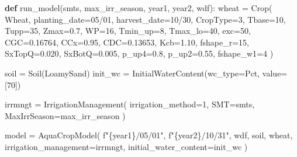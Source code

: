 \documentclass[
  letterpaper,
  DIV=11,
  numbers=noendperiod]{scrartcl}
\newenvironment{Shaded}{\begin{snugshade}}{\end{snugshade}}
\newcommand{\DecValTok}[1]{\textcolor[rgb]{0.68,0.00,0.00}{#1}}
\newcommand{\FloatTok}[1]{\textcolor[rgb]{0.68,0.00,0.00}{#1}}
\newcommand{\KeywordTok}[1]{\textcolor[rgb]{0.00,0.23,0.31}{\textbf{#1}}}
\newcommand{\NormalTok}[1]{\textcolor[rgb]{0.00,0.23,0.31}{#1}}
\newcommand{\OperatorTok}[1]{\textcolor[rgb]{0.37,0.37,0.37}{#1}}
\newcommand{\SpecialCharTok}[1]{\textcolor[rgb]{0.37,0.37,0.37}{#1}}
\newcommand{\SpecialStringTok}[1]{\textcolor[rgb]{0.13,0.47,0.30}{#1}}
\newcommand{\StringTok}[1]{\textcolor[rgb]{0.13,0.47,0.30}{#1}}
\begin{document}
\begin{Shaded}
\begin{Highlighting}[]
\KeywordTok{def}\NormalTok{ run\_model(smts, max\_irr\_season, year1, year2, wdf):}
\NormalTok{    wheat }\OperatorTok{=}\NormalTok{ Crop(}
        \StringTok{\textquotesingle{}Wheat\textquotesingle{}}\NormalTok{,}
\NormalTok{        planting\_date}\OperatorTok{=}\StringTok{\textquotesingle{}05/01\textquotesingle{}}\NormalTok{,}
\NormalTok{        harvest\_date}\OperatorTok{=}\StringTok{\textquotesingle{}10/30\textquotesingle{}}\NormalTok{,}
\NormalTok{        CropType}\OperatorTok{=}\DecValTok{3}\NormalTok{,}
\NormalTok{        Tbase}\OperatorTok{=}\DecValTok{10}\NormalTok{,}
\NormalTok{        Tupp}\OperatorTok{=}\DecValTok{35}\NormalTok{,}
\NormalTok{        Zmax}\OperatorTok{=}\FloatTok{0.7}\NormalTok{,}
\NormalTok{        WP}\OperatorTok{=}\DecValTok{16}\NormalTok{,}
\NormalTok{        Tmin\_up}\OperatorTok{=}\DecValTok{8}\NormalTok{,}
\NormalTok{        Tmax\_lo}\OperatorTok{=}\DecValTok{40}\NormalTok{,}
\NormalTok{        exc}\OperatorTok{=}\DecValTok{50}\NormalTok{,}
\NormalTok{        CGC}\OperatorTok{=}\FloatTok{0.16764}\NormalTok{,}
\NormalTok{        CCx}\OperatorTok{=}\FloatTok{0.95}\NormalTok{,}
\NormalTok{        CDC}\OperatorTok{=}\FloatTok{0.13653}\NormalTok{,}
\NormalTok{        Kcb}\OperatorTok{=}\FloatTok{1.10}\NormalTok{,}
\NormalTok{        fshape\_r}\OperatorTok{=}\DecValTok{15}\NormalTok{,}
\NormalTok{        SxTopQ}\OperatorTok{=}\FloatTok{0.020}\NormalTok{,}
\NormalTok{        SxBotQ}\OperatorTok{=}\FloatTok{0.005}\NormalTok{,}
\NormalTok{        p\_up4}\OperatorTok{=}\FloatTok{0.8}\NormalTok{,}
\NormalTok{        p\_up2}\OperatorTok{=}\FloatTok{0.55}\NormalTok{,}
\NormalTok{        fshape\_w1}\OperatorTok{=}\DecValTok{4}
\NormalTok{    )}

\NormalTok{    soil }\OperatorTok{=}\NormalTok{ Soil(}\StringTok{\textquotesingle{}LoamySand\textquotesingle{}}\NormalTok{)}
\NormalTok{    init\_wc }\OperatorTok{=}\NormalTok{ InitialWaterContent(wc\_type}\OperatorTok{=}\StringTok{\textquotesingle{}Pct\textquotesingle{}}\NormalTok{, value}\OperatorTok{=}\NormalTok{[}\DecValTok{70}\NormalTok{])}

\NormalTok{    irrmngt }\OperatorTok{=}\NormalTok{ IrrigationManagement(}
\NormalTok{        irrigation\_method}\OperatorTok{=}\DecValTok{1}\NormalTok{,}
\NormalTok{        SMT}\OperatorTok{=}\NormalTok{smts,}
\NormalTok{        MaxIrrSeason}\OperatorTok{=}\NormalTok{max\_irr\_season}
\NormalTok{    )}

\NormalTok{    model }\OperatorTok{=}\NormalTok{ AquaCropModel(}
        \SpecialStringTok{f"}\SpecialCharTok{\{}\NormalTok{year1}\SpecialCharTok{\}}\SpecialStringTok{/05/01"}\NormalTok{,}
        \SpecialStringTok{f"}\SpecialCharTok{\{}\NormalTok{year2}\SpecialCharTok{\}}\SpecialStringTok{/10/31"}\NormalTok{,}
\NormalTok{        wdf,}
\NormalTok{        soil,}
\NormalTok{        wheat,}
\NormalTok{        irrigation\_management}\OperatorTok{=}\NormalTok{irrmngt,}
\NormalTok{        initial\_water\_content}\OperatorTok{=}\NormalTok{init\_wc}
\NormalTok{    )}


\end{Highlighting}
\end{Shaded}
\end{document}
